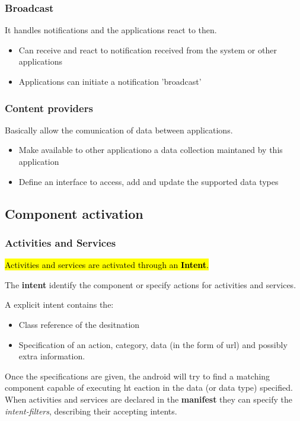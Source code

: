 \subsubsection{Broadcast}
It handles notifications and the applications react to then. 
\begin{itemize}
    \item Can receive and react to notification received from the system or other applications 
    \item Applications can initiate a notification 'broadcast' 
\end{itemize}

\subsubsection{Content providers} 
Basically allow the comunication of data between applications.
\begin{itemize}
    \item Make available to other applicationo a data collection maintaned by this application
    \item Define an interface to access, add and update the supported data types
\end{itemize}

\subsection{Component activation}

\subsubsection{Activities and Services}
\hl{Activities and services are activated through an \textbf{Intent}.}

The \textbf{intent} identify the component or specify actions for activities and services.  

A explicit intent contains the:
\begin{itemize}
    \item Class reference of the desitnation
    \item Specification of an action, category, data (in the form of url) and possibly extra information.
\end{itemize}

Once the specifications are given, the android will try to find a matching component capable of executing ht eaction in the data (or data type) specified.
When activities and services are declared in the \textbf{manifest} they can specify the \textit{intent-filters}, describing their accepting intents.


